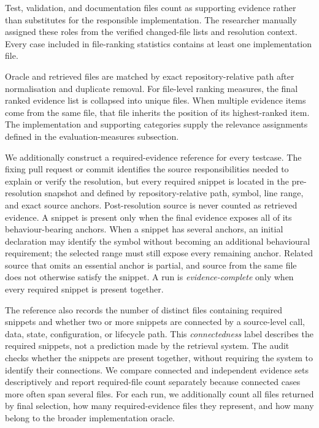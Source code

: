 Test, validation, and documentation files count as supporting evidence rather than substitutes for the responsible implementation. The researcher manually assigned these roles from the verified changed-file lists and resolution context. Every case included in file-ranking statistics contains at least one implementation file.

Oracle and retrieved files are matched by exact repository-relative path after normalisation and duplicate removal. For file-level ranking measures, the final ranked evidence list is collapsed into unique files. When multiple evidence items come from the same file, that file inherits the position of its highest-ranked item. The implementation and supporting categories supply the relevance assignments defined in the evaluation-measures subsection.

We additionally construct a required-evidence reference for every testcase. The fixing pull request or commit identifies the source responsibilities needed to explain or verify the resolution, but every required snippet is located in the pre-resolution snapshot and defined by repository-relative path, symbol, line range, and exact source anchors. Post-resolution source is never counted as retrieved evidence. A snippet is present only when the final evidence exposes all of its behaviour-bearing anchors. When a snippet has several anchors, an initial declaration may identify the symbol without becoming an additional behavioural requirement; the selected range must still expose every remaining anchor. Related source that omits an essential anchor is partial, and source from the same file does not otherwise satisfy the snippet. A run is \emph{evidence-complete} only when every required snippet is present together.

The reference also records the number of distinct files containing required snippets and whether two or more snippets are connected by a source-level call, data, state, configuration, or lifecycle path. This \emph{connectedness} label describes the required snippets, not a prediction made by the retrieval system. The audit checks whether the snippets are present together, without requiring the system to identify their connections. We compare connected and independent evidence sets descriptively and report required-file count separately because connected cases more often span several files. For each run, we additionally count all files returned by final selection, how many required-evidence files they represent, and how many belong to the broader implementation oracle.

